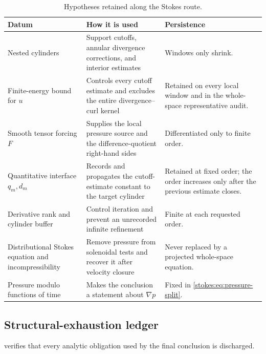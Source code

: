 \documentclass[11pt,reqno]{amsart}
\theoremstyle{plain}
\theoremstyle{definition}
\theoremstyle{remark}
\numberwithin{equation}{section}
\begin{document}
\begin{table}[H]
\caption{Hypotheses retained along the Stokes route.}
\label{tab:stokes-monotone}
\centering
\small
\begin{tabularx}{\textwidth}{@{}L{0.25\textwidth}Y L{0.22\textwidth}@{}}
\toprule
Datum & How it is used & Persistence \\
\midrule
Nested cylinders & Support cutoffs, annular divergence corrections, and
interior estimates & Windows only shrink. \\
Finite-energy bound for \(u\) & Controls every cutoff estimate and excludes
the entire divergence--curl kernel & Retained on every local window and in the
whole-space representative audit. \\
Smooth tensor forcing \(F\) & Supplies the local pressure source and the
difference-quotient right-hand sides & Differentiated only to finite order. \\
Quantitative interface \(q_m,d_m\) & Records and propagates the cutoff-estimate
constant to the target cylinder & Retained at fixed order; the order increases
only after the previous estimate closes. \\
Derivative rank and cylinder buffer & Control iteration and prevent an
unrecorded infinite refinement & Finite at each requested order. \\
Distributional Stokes equation and incompressibility & Remove pressure from
solenoidal tests and recover it after velocity closure & Never replaced by a
projected whole-space equation. \\
Pressure modulo functions of time & Makes the conclusion a statement about
\(\nabla p\) & Fixed in \eqref{stokes:eq:pressure-split}. \\
\bottomrule
\end{tabularx}
\end{table}

\subsection{Structural-exhaustion ledger}

 verifies that every analytic obligation used by the
final conclusion is discharged.
\end{document}
